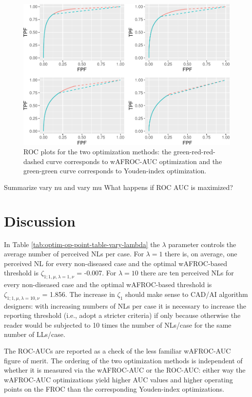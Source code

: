 \documentclass[
]{book}
\begin{document}
\begin{figure}
\centering
\includegraphics{21-optim-op-point_files/figure-latex/optim-op-point-vary-lambda-roc-1.pdf}
\caption{\label{fig:optim-op-point-vary-lambda-roc}ROC plots for the two optimization methods: the green-red-red-dashed curve corresponds to wAFROC-AUC optimization and the green-green curve corresponds to Youden-index optimization.}
\end{figure}

Summarize vary nu and vary mu
What happens if ROC AUC is maximized?

\hypertarget{optim-op-point-discussion}{%
\section{Discussion}\label{optim-op-point-discussion}}

In Table \ref{tab:optim-op-point-table-vary-lambda} the \(\lambda\) parameter controls the average number of perceived NLs per case. For \(\lambda = 1\) there is, on average, one perceived NL for every non-diseased case and the optimal wAFROC-based threshold is \(\zeta_{1;1,\mu, \lambda = 1, \nu}\) = -0.007. For \(\lambda = 10\) there are ten perceived NLs for every non-diseased case and the optimal wAFROC-based threshold is \(\zeta_{1;1,\mu, \lambda = 10, \nu}\) = 1.856. The increase in \(\zeta_1\) should make sense to CAD/AI algorithm designers: with increasing numbers of NLs per case it is necessary to increase the reporting threshold (i.e., adopt a stricter criteria) if only because otherwise the reader would be subjected to 10 times the number of NLs/case for the same number of LLs/case.

The ROC-AUCs are reported as a check of the less familiar wAFROC-AUC figure of merit. The ordering of the two optimization methods is independent of whether it is measured via the wAFROC-AUC or the ROC-AUC: either way the wAFROC-AUC optimizations yield higher AUC values and higher operating points on the FROC than the corresponding Youden-index optimizations.
\end{document}
